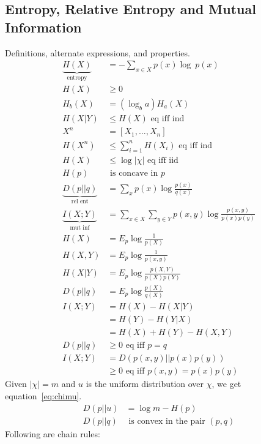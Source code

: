 \documentclass[10pt]{article}
\begin{document}
\begin{scriptsize}
\begin{multicols}{3}

\section*{Entropy, Relative Entropy and Mutual Information}
Definitions, alternate expressions, and properties.
\begin{align}
\underbrace{H(X)}_\text{entropy}&= -\sum_{x\in X} p(x) \log\ p(x) \label{eq:entropy}\\
H(X)& \geq 0\\
H_b(X)&= (\log_b a)H_a(X)\\
H(X|Y)& \leq  H(X)\text{ eq iff ind} \label{eq:conditioning}\\
X^n&=[X_1,\ldots,X_n]\\
H(X^n)& \leq \sum_{i=1}^n H(X_i)\text{ eq iff ind} \label{eq:jointsum}\\
H(X)&\leq  \log |\chi|  \text{ eq iff iid}\label{eq:alphabetentropy}\\
H(p)&\text{ is concave in $p$}\\
\underbrace{D(p||q)}_\text{rel ent} & = \sum_x p(x) \log \frac{p(x)}{q(x)}\\
\underbrace{I(X;Y)}_\text{mut inf} & = \sum_{x\in X} \sum_{y \in Y} p(x,y) \log \frac{p(x,y)}{p(x)p(y)}\\
H(X)&=E_p \log \frac{1}{p(X)}\\
H(X,Y)&=E_p\log \frac{1}{p(x,y)}\\
H(X|Y)&=E_p\log \frac{p(X,Y)}{p(X)p(Y)}\\
D(p||q)&=E_p\log \frac{p(X)}{q(X)}\\
I(X;Y)&=H(X)-H(X|Y)\\
&=H(Y)-H(Y|X)\\
&=H(X)+H(Y)-H(X,Y)\\
D(p||q)&\geq 0 \text{ eq iff $p=q$}\\
I(X;Y)&=D(p(x,y)||p(x)p(y))\\
	&\geq 0 \text{ eq iff $p(x,y)=p(x)p(y)$}
\end{align}
Given $|\chi|=m$ and $u$ is the uniform distribution over $\chi$, we get equation~\ref{eq:chimu}.
\begin{align}
D(p||u)&=\log m - H(p)\label{eq:chimu}\\
D(p||q)&\text{ is convex in the pair }(p,q)
\end{align}
Following are chain rules:
\begin{align}

\end{align}
\end{multicols}
\end{scriptsize}
\end{document}
